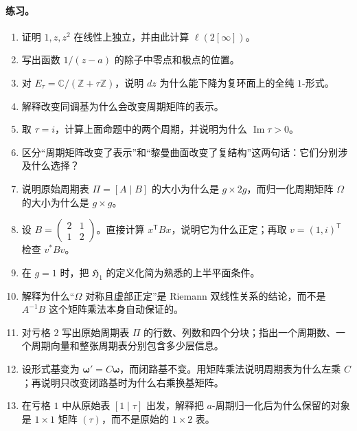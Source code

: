 \documentclass[UTF8,fontset=none,a4paper,11pt]{ctexart}
\theoremstyle{foundation-definition}
\theoremstyle{foundation-theorem}
\theoremstyle{foundation-proposition}
\theoremstyle{foundation-example}
\theoremstyle{foundation-remark}
\theoremstyle{foundation-theorem}
\begin{document}
\paragraph{练习。}
\begin{enumerate}[label=M6.\arabic*.]
  \item 证明 \(1,z,z^2\) 在线性上独立，并由此计算 \(\ell(2[\infty])\)。
  \item 写出函数 \(1/(z-a)\) 的除子中零点和极点的位置。
  \item 对 \(E_\tau=\mathbb C/(\mathbb Z+\tau\mathbb Z)\)，说明 \(dz\) 为什么能下降为复环面上的全纯 \(1\)-形式。
  \item 解释改变同调基为什么会改变周期矩阵的表示。
  \item 取 \(\tau=i\)，计算上面命题中的两个周期，并说明为什么 \(\operatorname{Im}\tau>0\)。
  \item 区分“周期矩阵改变了表示”和“黎曼曲面改变了复结构”这两句话：它们分别涉及什么选择？
  \item 说明原始周期表 \(\Pi=[A\mid B]\) 的大小为什么是 \(g\times2g\)，而归一化周期矩阵 \(\Omega\) 的大小为什么是 \(g\times g\)。
  \item 设 \(B=\begin{pmatrix}2&1\\1&2\end{pmatrix}\)。直接计算 \(x^{\mathsf T}Bx\)，说明它为什么正定；再取 \(v=(1,i)^{\mathsf T}\) 检查 \(v^*Bv\)。
  \item 在 \(g=1\) 时，把 \(\mathfrak H_1\) 的定义化简为熟悉的上半平面条件。
  \item 解释为什么“\(\Omega\) 对称且虚部正定”是 Riemann 双线性关系的结论，而不是 \(A^{-1}B\) 这个矩阵乘法本身自动保证的。
  \item 对亏格 \(2\) 写出原始周期表 \(\Pi\) 的行数、列数和四个分块；指出一个周期数、一个周期向量和整张周期表分别包含多少层信息。
  \item 设形式基变为 \(\boldsymbol\omega'=C\boldsymbol\omega\)，而闭路基不变。用矩阵乘法说明周期表为什么左乘 \(C\)；再说明只改变闭路基时为什么右乘换基矩阵。
  \item 在亏格 \(1\) 中从原始表 \([1\mid\tau]\) 出发，解释把 \(a\)-周期归一化后为什么保留的对象是 \(1\times1\) 矩阵 \((\tau)\)，而不是原始的 \(1\times2\) 表。
\end{enumerate}
\end{document}
